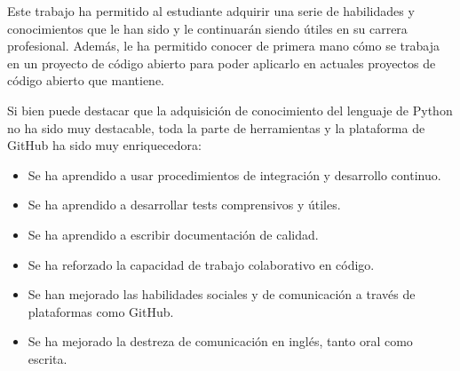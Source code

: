 Este trabajo ha permitido al estudiante adquirir una serie de habilidades y conocimientos que le han sido y le continuarán siendo útiles en su carrera profesional. Además, le ha permitido conocer de primera mano cómo se trabaja en un proyecto de código abierto para poder aplicarlo en actuales proyectos de código abierto que mantiene.

Si bien puede destacar que la adquisición de conocimiento del lenguaje de Python no ha sido muy destacable, toda la parte de herramientas y la plataforma de GitHub ha sido muy enriquecedora:

\begin{itemize}
  \item Se ha aprendido a usar procedimientos de integración y desarrollo continuo.
  \item Se ha aprendido a desarrollar tests comprensivos y útiles.
  \item Se ha aprendido a escribir documentación de calidad.
  \item Se ha reforzado la capacidad de trabajo colaborativo en código.
  \item Se han mejorado las habilidades sociales y de comunicación a través de plataformas como GitHub.
  \item Se ha mejorado la destreza de comunicación en inglés, tanto oral como escrita.
\end{itemize}
